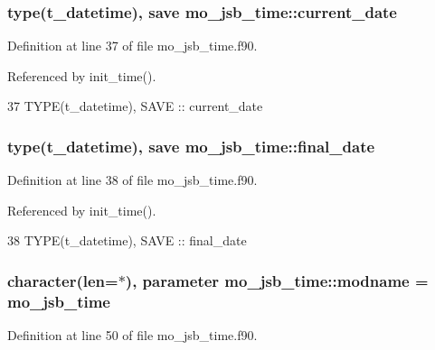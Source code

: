 \subsubsection[{current\+\_\+date}]{\setlength{\rightskip}{0pt plus 5cm}type(t\+\_\+datetime), save mo\+\_\+jsb\+\_\+time\+::current\+\_\+date}\label{namespacemo__jsb__time_a1a0e4eb7d850630c29d3e80a77cac78b}


Definition at line 37 of file mo\+\_\+jsb\+\_\+time.\+f90.



Referenced by init\+\_\+time().


\begin{DoxyCode}
37   \textcolor{keywordtype}{TYPE}(t\_datetime), \textcolor{keywordtype}{SAVE} :: current\_date
\end{DoxyCode}
\hypertarget{namespacemo__jsb__time_a6ee919b8447b1554b208420eb0760e95}{}
\subsubsection[{final\+\_\+date}]{\setlength{\rightskip}{0pt plus 5cm}type(t\+\_\+datetime), save mo\+\_\+jsb\+\_\+time\+::final\+\_\+date}\label{namespacemo__jsb__time_a6ee919b8447b1554b208420eb0760e95}


Definition at line 38 of file mo\+\_\+jsb\+\_\+time.\+f90.



Referenced by init\+\_\+time().


\begin{DoxyCode}
38   \textcolor{keywordtype}{TYPE}(t\_datetime), \textcolor{keywordtype}{SAVE} :: final\_date
\end{DoxyCode}
\hypertarget{namespacemo__jsb__time_a44d3acf17e06ee576cf456b9fa721952}{}
\subsubsection[{modname}]{\setlength{\rightskip}{0pt plus 5cm}character(len=$\ast$), parameter mo\+\_\+jsb\+\_\+time\+::modname = \textquotesingle{}mo\+\_\+jsb\+\_\+time\textquotesingle{}}\label{namespacemo__jsb__time_a44d3acf17e06ee576cf456b9fa721952}


Definition at line 50 of file mo\+\_\+jsb\+\_\+time.\+f90.



